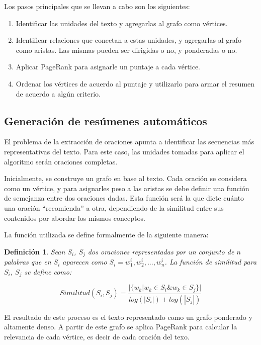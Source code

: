 \documentclass{llncs}
\newtheorem{definicion}{Definición}
\begin{document}
Los pasos principales que se llevan a cabo son los siguientes:

\begin{enumerate}
\item Identificar las unidades del texto y agregarlas al grafo como vértices.
\item Identificar relaciones que conectan a estas unidades, y agregarlas al grafo como aristas. Las mismas pueden ser dirigidas o no, y ponderadas o no.
\item Aplicar PageRank para asignarle un puntaje a cada vértice.
\item Ordenar los vértices de acuerdo al puntaje y utilizarlo para armar el resumen de acuerdo a algún criterio.
\end{enumerate}

\subsection{Generación de resúmenes automáticos}
El problema de la extracción de oraciones apunta a identificar las secuencias más representativas del texto. Para este caso, las unidades tomadas para aplicar el algoritmo serán oraciones completas.

Inicialmente, se construye un grafo en base al texto. Cada oración se considera como un vértice, y para asignarles peso a las aristas se debe definir una función de semejanza entre dos oraciones dadas. Esta función será la que dicte cuánto una oración “recomienda” a otra, dependiendo de la similitud entre sus contenidos por abordar los mismos conceptos.
    
La función utilizada se define formalmente de la siguiente manera:


\begin{definicion}
Sean $S_i$, $S_j$ dos oraciones representadas por un conjunto de $n$ palabras que en 
$S_i$ aparecen como $S_i = w_{1}^{i}, w_{2}^{i},..., w_{n}^{i}$. La función de similitud para $S_i$, $S_j$ se define como:


\begin{equation}
Similitud(S_{i},S_{j}) = \frac{ | \{   w_{k} | w_{k} \in S_{i} \& w_{k} \in S_{j}   \}  | }    
                              {  log(|S_{i}|) + log(|S_{j}|)  }
\end{equation}


\end{definicion}
    
El resultado de este proceso es el texto representado como un grafo ponderado y altamente denso. A partir de este grafo se aplica PageRank para calcular la relevancia de cada vértice, es decir de cada oración del texo.
\end{document}
